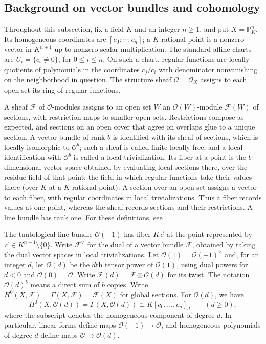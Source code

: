 \documentclass[12pt,reqno,a4paper]{amsart}
\numberwithin{equation}{section}
\numberwithin{figure}{section}
\theoremstyle{plain}
\theoremstyle{definition}
\begin{document}
\subsection{Background on vector bundles and cohomology}
\label{subsec:appendix-background}

Throughout this subsection, fix a field $K$ and an integer $n\geq1$,
and put $X=\mathbb P^n_K$.
Its homogeneous coordinates are $[c_0:\cdots:c_n]$; a $K$-rational
point is a nonzero vector in $K^{n+1}$ up to nonzero scalar multiplication.
The standard affine charts are $U_i=\{c_i\ne0\}$, for $0\leq i\leq n$.
On such a chart, regular functions are locally quotients of polynomials
in the coordinates $c_j/c_i$ with denominator nonvanishing on the
neighborhood in question. The structure sheaf $\mathcal O=\mathcal O_X$
assigns to each open set its ring of regular functions.

A sheaf $\mathcal F$ of $\mathcal O$-modules assigns to an open set $W$
an $\mathcal O(W)$-module $\mathcal F(W)$ of sections, with restriction maps to smaller
open sets. Restrictions compose as expected, and sections on an open
cover that agree on overlaps glue to a unique section.
A vector bundle of rank $b$ is identified with its sheaf of sections,
which is locally isomorphic to $\mathcal O^b$; such a sheaf is called
finite locally free, and a local identification with $\mathcal O^b$
is called a local trivialization. Its fiber at a point is the
$b$-dimensional vector space obtained by evaluating local sections
there, over the residue field of that point: the field in which regular
functions take their values there (over $K$ at a $K$-rational point).
A section over an open set assigns a vector to each fiber, with
regular coordinates in local trivializations.
Thus a fiber records values at one point, whereas the sheaf records
sections and their restrictions. A line bundle has rank one.
For these definitions, see \cite[Chapter~II, \S\S1 and~5]{Hartshorne}.

The tautological line bundle $\mathcal O(-1)$ has fiber $K\vec c$
at the point represented by $\vec c\in K^{n+1}\setminus\{0\}$.
Write $\mathcal F^\vee$ for the dual of a vector bundle $\mathcal F$,
obtained by taking the dual vector spaces in local trivializations.
Let $\mathcal O(1)=\mathcal O(-1)^\vee$ and, for an integer $d$,
let $\mathcal O(d)$ be the $d$th tensor power of $\mathcal O(1)$,
using dual powers for $d<0$ and $\mathcal O(0)=\mathcal O$.
Write $\mathcal F(d)=\mathcal F\otimes\mathcal O(d)$ for its twist.
The notation $\mathcal O(d)^b$ means a direct sum of $b$ copies.
Write $H^0(X,\mathcal F)=\Gamma(X,\mathcal F)=\mathcal F(X)$ for
global sections. For $\mathcal O(d)$, we have
\begin{equation}\label{app:eq:line-bundle-sections}
 H^0(X,\mathcal O(d))=\Gamma(X,\mathcal O(d))
       \cong K[c_0,\ldots,c_n]_d\qquad(d\geq0),
\end{equation}
where the subscript denotes the homogeneous component of degree $d$.
In particular, linear forms define maps $\mathcal O(-1)\to\mathcal O$,
and homogeneous polynomials of degree $d$ define maps
$\mathcal O\to\mathcal O(d)$.
\end{document}
